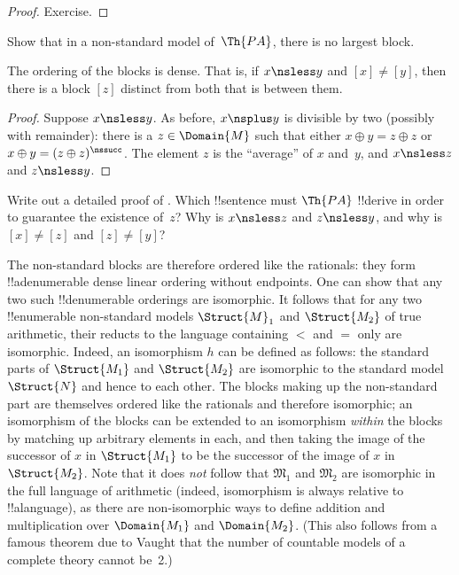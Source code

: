 \documentclass[../../../include/open-logic-section]{subfiles}
\begin{document}
\begin{proof}
Exercise.
\end{proof}

\begin{prob}
Show that in a non-standard model of~$\Th{PA}$, there is no largest
block.
\end{prob}

\begin{prop}
The ordering of the blocks is dense. That is, if $x \nsless y$ and
$[x] \neq [y]$, then there is a block $[z]$ distinct from both that is
between them.
\end{prop}

\begin{proof}
Suppose $x \nsless y$. As before, $x \nsplus y$ is divisible by two
(possibly with remainder): there is a $z \in \Domain{M}$ such that
either $x \oplus y = z \oplus z$ or $x \oplus y = (z \oplus
z)^\nssucc$. The element $z$ is the ``average'' of $x$ and~$y$, and $x
\nsless z$ and $z \nsless y$.
\end{proof}

\begin{prob}
Write out a detailed proof of
. Which !!{sentence} must
$\Th{PA}$ !!{derive} in order to guarantee the existence of~$z$? Why
is $x \nsless z$ and $z \nsless y$, and why is $[x] \neq [z]$ and $[z]
\neq [y]$?
\end{prob}

\begin{explain}
The non-standard blocks are therefore ordered like the rationals: they
form !!a{denumerable} dense linear ordering without endpoints.  One can show
that any two such !!{denumerable} orderings are isomorphic. It follows
that for any two !!{enumerable} non-standard models $\Struct{M}_1$ and
$\Struct{M_2}$ of true arithmetic, their reducts to the language
containing $<$ and $=$ only are isomorphic. Indeed, an isomorphism $h$
can be defined as follows: the standard parts of $\Struct{M_1}$ and
$\Struct{M_2}$ are isomorphic to the standard model $\Struct{N}$ and
hence to each other. The blocks making up the non-standard part are
themselves ordered like the rationals and therefore isomorphic; an
isomorphism of the blocks can be extended to an isomorphism
\emph{within} the blocks by matching up arbitrary elements in each,
and then taking the image of the successor of $x$ in $\Struct{M_1}$ to
be the successor of the image of $x$ in $\Struct{M_2}$. Note that it
does \emph{not} follow that $\mathfrak{M}_1$ and $\mathfrak{M}_2$ are
isomorphic in the full language of arithmetic (indeed, isomorphism is
always relative to !!a{language}), as there are non-isomorphic ways to
define addition and multiplication over $\Domain{M_1}$ and
$\Domain{M_2}$. (This also follows from a famous theorem due to Vaught
that the number of countable models of a complete theory cannot be~2.)
\end{explain}
\end{document}
